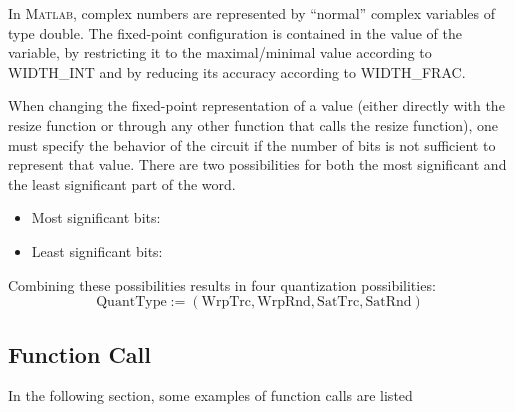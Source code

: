 \documentclass[a4paper,11pt]{article}
\begin{document}
In \textsc{Matlab}, complex numbers are represented by ``normal''
complex variables of type double. The fixed-point configuration is
contained in the value of the variable, by restricting it to the
maximal/minimal value according to WIDTH\_INT and by reducing its
accuracy according to WIDTH\_FRAC.

When changing the fixed-point representation of a value (either
directly with the resize function or through any other function that
calls the resize function), one must specify the behavior of the
circuit if the number of bits is not sufficient to represent that
value. There are two possibilities for both the most significant and
the least significant part of the word.
\begin{itemize}
\item Most significant bits:
\item Least significant bits:
\end{itemize}

Combining these possibilities results in four quantization
possibilities:
\begin{equation*}
  \mathrm{QuantType} := \mathrm{(WrpTrc, WrpRnd, SatTrc, SatRnd)}
\end{equation*}

\subsection{Function Call}
In the following section, some examples of function calls are listed
\end{document}
